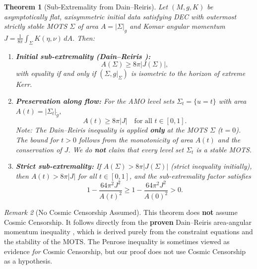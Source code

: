 \documentclass[12pt]{article}
\theoremstyle{plain}
\newtheorem{theorem}{Theorem}[section]
\theoremstyle{definition}
\theoremstyle{remark}
\newtheorem{remark}[theorem]{Remark}
\newcommand{\tg}{\tilde{g}}
\begin{document}
\begin{theorem}[Sub-Extremality from Dain--Reiris]\label{thm:subext}
Let $(M, g, K)$ be asymptotically flat, axisymmetric initial data satisfying DEC with outermost strictly stable MOTS $\Sigma$ of area $A = |\Sigma|_g$ and Komar angular momentum $J = \frac{1}{8\pi}\int_\Sigma K(\eta, \nu)\,dA$. Then:
\begin{enumerate}[label=\textup{(\roman*)}]
    \item \textbf{Initial sub-extremality (Dain--Reiris \cite{dain2011}):}
    \[
    A(\Sigma) \geq 8\pi|J(\Sigma)|,
    \]
    with equality if and only if $(\Sigma, g|_\Sigma)$ is isometric to the horizon of extreme Kerr.
    \item \textbf{Preservation along flow:} For the AMO level sets $\Sigma_t = \{u = t\}$ with area $A(t) = |\Sigma_t|_{\tg}$,
    \[
    A(t) \geq 8\pi|J| \quad \text{for all } t \in [0, 1].
    \]
    \emph{Note:} The Dain--Reiris inequality is applied \textbf{only} at the MOTS $\Sigma$ ($t=0$). The bound for $t > 0$ follows from the monotonicity of area $A(t)$ and the conservation of $J$. We do \textbf{not} claim that every level set $\Sigma_t$ is a stable MOTS.
    \item \textbf{Strict sub-extremality:} If $A(\Sigma) > 8\pi|J(\Sigma)|$ (strict inequality initially), then $A(t) > 8\pi|J|$ for all $t \in [0,1]$, and the sub-extremality factor satisfies
    \[
    1 - \frac{64\pi^2 J^2}{A(t)^2} \geq 1 - \frac{64\pi^2 J^2}{A(0)^2} > 0.
    \]
\end{enumerate}
\end{theorem}

\begin{remark}[No Cosmic Censorship Assumed]
This theorem does \textbf{not} assume Cosmic Censorship. It follows directly from the \textbf{proven} Dain--Reiris area-angular momentum inequality \cite{dain2011}, which is derived purely from the constraint equations and the stability of the MOTS. The Penrose inequality is sometimes viewed as evidence \emph{for} Cosmic Censorship, but our proof does not use Cosmic Censorship as a hypothesis.
\end{remark}
\end{document}
